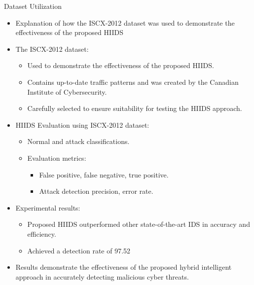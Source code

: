 \documentclass{beamer}
\begin{document}
\begin{frame}{Dataset Utilization}
  \begin{itemize}
    \item Explanation of how the ISCX-2012 dataset was used to demonstrate the effectiveness of the proposed HIIDS
  \end{itemize}

  \begin{itemize}
    \item The ISCX-2012 dataset:
      \begin{itemize}
        \item Used to demonstrate the effectiveness of the proposed HIIDS.
        \item Contains up-to-date traffic patterns and was created by the Canadian Institute of Cybersecurity.
        \item Carefully selected to ensure suitability for testing the HIIDS approach.
      \end{itemize}
    \item HIIDS Evaluation using ISCX-2012 dataset:
      \begin{itemize}
        \item Normal and attack classifications.
        \item Evaluation metrics:
          \begin{itemize}
            \item False positive, false negative, true positive.
            \item Attack detection precision, error rate.
          \end{itemize}
      \end{itemize}
    \item Experimental results:
      \begin{itemize}
        \item Proposed HIIDS outperformed other state-of-the-art IDS in accuracy and efficiency.
        \item Achieved a detection rate of 97.52%
      \end{itemize}
    \item Results demonstrate the effectiveness of the proposed hybrid intelligent approach in accurately detecting malicious cyber threats.
  \end{itemize}
\end{frame}
\end{document}
